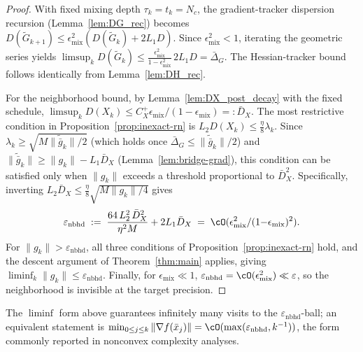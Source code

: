 \documentclass[review,onefignum,onetabnum]{siamart171218}
\begin{document}
\begin{proof}
With fixed mixing depth $\tau_k=t_k=N_c$, the gradient-tracker
dispersion recursion (Lemma~\ref{lem:DG_rec}) becomes
$D(\tilde G_{k+1})\le\epsilon_{\mathrm{mix}}^2(D(\tilde G_k)+2L_1D)$.
Since $\epsilon_{\mathrm{mix}}^2<1$, iterating the geometric series yields
$\limsup_{k}D(\tilde G_k)\le \frac{\epsilon_{\mathrm{mix}}^2}{1-\epsilon_{\mathrm{mix}}^2}\,2L_1D
=\bar\Delta_G$.
The Hessian-tracker bound follows identically from Lemma~\ref{lem:DH_rec}.

For the neighborhood bound, by Lemma~\ref{lem:DX_post_decay} with the fixed schedule,
$\limsup_k D(X_k)\le C_X^{+}\epsilon_{\mathrm{mix}}/(1-\epsilon_{\mathrm{mix}})=:\bar D_X$.
The most restrictive condition in Proposition~\ref{prop:inexact-rn}
is $L_2 D(X_k)\le\frac{\eta}{8}\lambda_k$.
Since $\lambda_k\ge\sqrt{M\|\tilde{\bar g}_k\|/2}$
(which holds once $\bar\Delta_G\le\|\tilde{\bar g}_k\|/2$) and
$\|\tilde{\bar g}_k\|\ge\|g_k\|-L_1\bar D_X$
(Lemma~\ref{lem:bridge-grad}), this condition can be satisfied only when
$\|g_k\|$ exceeds a threshold proportional to $\bar D_X^2$.
Specifically, inverting $L_2\bar D_X\le\frac{\eta}{8}\sqrt{M\|g_k\|/4}$
gives
\[
\varepsilon_{\mathrm{nbhd}}
\;:=\;
\frac{64\,L_2^2\,\bar D_X^2}{\eta^2 M}
+2L_1\bar D_X
\;=\;\cO(\epsilon_{\mathrm{mix}}^2/(1{-}\epsilon_{\mathrm{mix}})^2).
\]
For $\|g_k\|>\varepsilon_{\mathrm{nbhd}}$, all three conditions of
Proposition~\ref{prop:inexact-rn} hold, and the descent
argument of Theorem~\ref{thm:main} applies,
giving $\liminf_k\|g_k\|\le\varepsilon_{\mathrm{nbhd}}$.
Finally, for $\epsilon_{\mathrm{mix}}\ll 1$,
$\varepsilon_{\mathrm{nbhd}}=\cO(\epsilon_{\mathrm{mix}}^2)\ll\varepsilon$,
so the neighborhood is invisible at the target precision.
\end{proof}

\begin{remark}\label{rem:liminf_form}
The $\liminf$ form above guarantees infinitely many visits to
the $\varepsilon_{\mathrm{nbhd}}$-ball; an equivalent statement is
$\min_{0\le j\le k}\|\nabla f(\bar x_j)\|
=\cO(\max(\varepsilon_{\mathrm{nbhd}}, k^{-1}))$,
the form commonly reported in nonconvex complexity analyses.
\end{remark}
\end{document}
